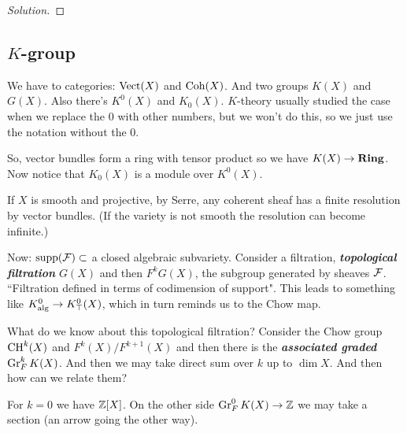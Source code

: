 \begin{proof}[Solution]
	
\end{proof}

\subsection{$K$-group}
We have to categories: $\operatorname{Vect}(X)$ and $\operatorname{Coh}(X)$. And two groups $K(X)$ and $G(X)$. Also there's $K^0(X)$ and $K_0(X)$. $K$-theory usually studied the case when we replace the $0$ with other numbers, but we won't do this, so we just use the notation without the $0$.

So, vector bundles form a ring with tensor product so we have $K(X)\to \mathbf{Ring}$. Now notice that $K_0(X)$ is a module over $K^0(X)$.

If $X$ is smooth and projective, by Serre, any coherent sheaf has a finite resolution by vector bundles. (If the variety is not smooth the resolution can become infinite.)

Now: $\operatorname{supp}(\mathcal{F})\subset$ a closed algebraic subvariety. Consider a filtration, \textbf{\textit{topological filtration}} $G(X)$ and then $F^kG(X)$, the subgroup generated by sheaves $\mathcal{F}$. ``Filtration defined in terms of codimension of support". This leads to something like $K^0_{\mathrm{alg}}\to K^0_{\top}(X)$, which in turn reminds us to the Chow map.

What do we know about this topological filtration? Consider the Chow group $\operatorname{CH}^k(X)$ and $F^k(X)/F^{k+1}(X)$ and then there is the \textbf{\textit{associated graded}} $\operatorname{Gr}^k_FK(X)$. And then we may take direct sum over $k$ up to $\dim X$. And then how can we relate them?

For $k=0$ we have $\mathbb{Z}[X]$. On the other side $\operatorname{Gr}^0_FK(X)\to \mathbb{Z}$ we may take a section (an arrow going the other way).


